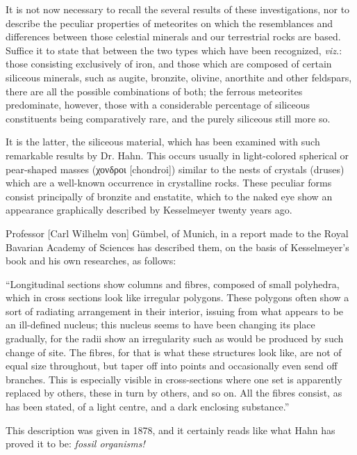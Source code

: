 \documentclass[a4paper, 12pt, oneside]{article}
\begin{document}
It is not now necessary to recall the several results of these investigations, nor to describe the peculiar properties of meteorites on which the resemblances and differences between those celestial minerals and our terrestrial rocks are based. Suffice it to state that between the two types which have been recognized, \emph{viz.}: those consisting exclusively of iron, and those which are composed of certain siliceous minerals, such as augite, bronzite, olivine, anorthite and other feldspars, there are all the possible combinations of both; the ferrous meteorites predominate, however, those with a considerable percentage of siliceous constituents being comparatively rare, and the purely siliceous still more so.

It is the latter, the siliceous material, which has been examined with such remarkable results by Dr. Hahn. This occurs usually in light-colored spherical or pear-shaped masses (χονδροι [chondroi]) similar to the nests of crystals (druses) which are a well-known occurrence in crystalline rocks. These peculiar forms consist principally of bronzite and enstatite, which to the naked eye show an appearance graphically described by Kesselmeyer twenty years ago.

Professor [Carl Wilhelm von] Gümbel, of Munich, in a report made to the Royal Bavarian Academy of Sciences has described them, on the basis of Kesselmeyer's book and his own researches, as follows:

``Longitudinal sections show columns and fibres, composed of small polyhedra, which in cross sections look like irregular polygons. These polygons often show a sort of radiating arrangement in their interior, issuing from what appears to be an ill-defined nucleus; this nucleus seems to have been changing its place gradually, for the radii show an irregularity such as would be produced by such change of site. The fibres, for that is what these structures look like, are not of equal size throughout, but taper off into points and occasionally even send off branches. This is especially visible in cross-sections where one set is apparently replaced by others, these in turn by others, and so on. All the fibres consist, as has been stated, of a light centre, and a dark enclosing substance.''

This description was given in 1878, and it certainly reads like what Hahn has proved it to be: \emph{fossil organisms!}
\end{document}
